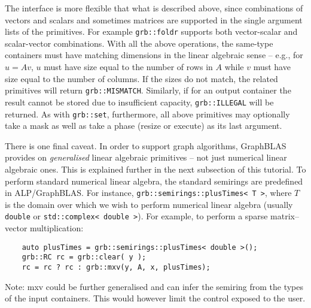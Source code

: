     The interface is more flexible that what is described above, since combinations of vectors and scalars and sometimes matrices
    are supported in the single argument lists of the primitives. 
    For example \texttt{grb::foldr} supports both vector-scalar and scalar-vector combinations.
    With all the above operations, the same-type containers must have matching dimensions in the linear algebraic sense -- e.g., 
    for $u=Av$, $u$ must have size equal to the number of rows in $A$ while $v$ must have size equal to the number of columns. 
    If the sizes do not match, the related primitives will return \texttt{grb::MISMATCH}. 
    Similarly, if for an output container the result cannot be stored due to insufficient capacity, 
    \texttt{grb::ILLEGAL} will be returned. As with \texttt{grb::set}, 
    furthermore, all above primitives may optionally take a mask as well as take a phase (resize or execute) 
    as its last argument.

    There is one final caveat. In order to support graph algorithms, GraphBLAS provides on \emph{generalised} 
    linear algebraic primitives -- not just numerical linear algebraic ones. 
    This is explained further in the next subsection of this tutorial. 
    To perform standard numerical linear algebra, the standard semirings are predefined in ALP/GraphBLAS. 
    For instance, \texttt{grb::semirings::plusTimes< T >}, where $T$ is the domain over which we wish to perform numerical 
    linear algebra (usually \texttt{double} or \texttt{std::complex< double >}). 
    For example, to perform a sparse matrix--vector multiplication:
    \begin{lstlisting}
    auto plusTimes = grb::semirings::plusTimes< double >();
    grb::RC rc = grb::clear( y );
    rc = rc ? rc : grb::mxv(y, A, x, plusTimes);
    \end{lstlisting}
    Note: mxv could be further generalised and can infer the semiring from the types of the input containers. This would however limit the control exposed to the user.


